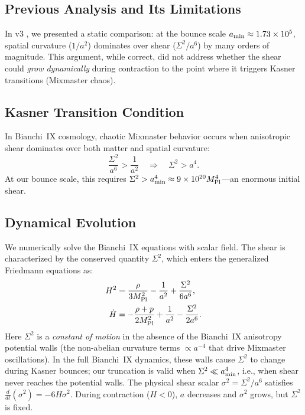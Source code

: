 \documentclass[11pt,a4paper]{article}
\begin{document}
\subsection{Previous Analysis and Its Limitations}

In v3 \cite{Kravchenko2025v3}, we presented a static comparison: at the bounce scale $a_{\rm min} \approx 1.73 \times 10^5$, spatial curvature ($1/a^2$) dominates over shear ($\Sigma^2/a^6$) by many orders of magnitude. This argument, while correct, did not address whether the shear could \emph{grow dynamically} during contraction to the point where it triggers Kasner transitions (Mixmaster chaos).

\subsection{Kasner Transition Condition}

In Bianchi~IX cosmology, chaotic Mixmaster behavior \cite{Belinsky1970,Belinsky1982} occurs when anisotropic shear dominates over both matter and spatial curvature:
\begin{equation}
\frac{\Sigma^2}{a^6} > \frac{1}{a^2} \quad \Longrightarrow \quad \Sigma^2 > a^4.
\label{eq:kasner_condition}
\end{equation}
At our bounce scale, this requires $\Sigma^2 > a_{\rm min}^4 \approx 9 \times 10^{20} M_{\rm Pl}^4$---an enormous initial shear.

\subsection{Dynamical Evolution}

We numerically solve the Bianchi~IX equations with scalar field. The shear is characterized by the conserved quantity $\Sigma^2$, which enters the generalized Friedmann equations as:
\begin{align}
H^2 &= \frac{\rho}{3M_{\rm Pl}^2} - \frac{1}{a^2} + \frac{\Sigma^2}{6a^6}, \\
\dot{H} &= -\frac{\rho+p}{2M_{\rm Pl}^2} + \frac{1}{a^2} - \frac{\Sigma^2}{2a^6}.
\end{align}
Here $\Sigma^2$ is a \emph{constant of motion} in the absence of the Bianchi~IX anisotropy potential walls (the non-abelian curvature terms $\propto a^{-4}$ that drive Mixmaster oscillations). In the full Bianchi~IX dynamics, these walls cause $\Sigma^2$ to change during Kasner bounces; our truncation is valid when $\Sigma^2 \ll a_{\rm min}^4$, i.e., when shear never reaches the potential walls. The physical shear scalar $\sigma^2 = \Sigma^2/a^6$ satisfies $\tfrac{d}{dt}(\sigma^2) = -6H\sigma^2$. During contraction ($H < 0$), $a$ decreases and $\sigma^2$ grows, but $\Sigma^2$ is fixed.
\end{document}
